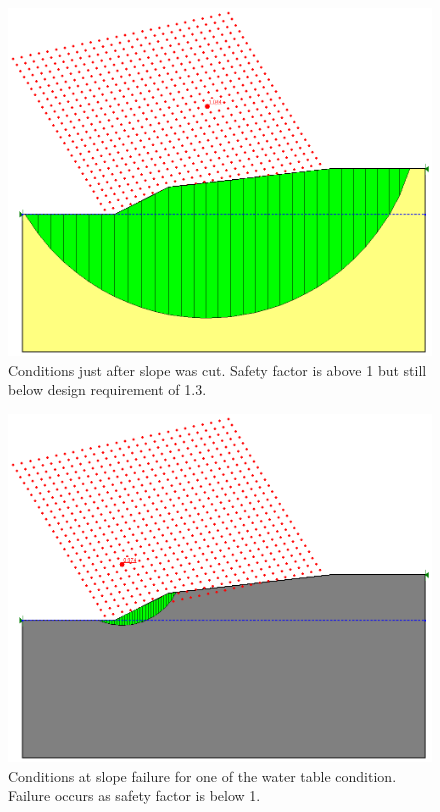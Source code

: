 \documentclass[a4paper]{article}
\begin{document}
\begin{center}
\begin{figure}[ht]
\includegraphics{undrained}
\caption{Conditions just after slope was cut. Safety factor is above 1 but still below design requirement of 1.3.}
\label{fig:undrained}
\end{figure}

\begin{figure}[ht]
\includegraphics{drained}
\caption{Conditions at slope failure for one of the water table condition. Failure occurs as safety factor is below 1.}
\label{fig:drained}
\end{figure}


\end{center}
\end{document}
